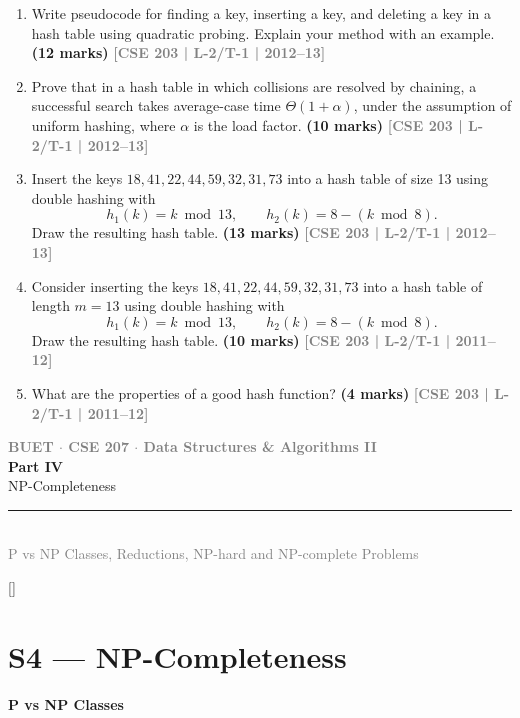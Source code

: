 \documentclass[12pt,a3paper]{article}
\newcommand{\yr}[1]{\hfill\textcolor{gray}{\small\textbf{[#1]}}}
\newcommand{\mk}[1]{\textcolor{orange!70!black}{\small\textbf{(#1 marks)}}}
\newcommand{\subtopic}[2]{%
  \vspace{10pt}
  \noindent\begin{tcolorbox}[colback=#1!8,colframe=#1,boxrule=0.6pt,arc=4pt,
    left=6pt,right=6pt,top=4pt,bottom=4pt]
    \small\bfseries\textcolor{#1}{#2}
  \end{tcolorbox}
  \vspace{2pt}
}
\newcommand{\secdivider}[5]{%
  \newpage\thispagestyle{empty}%
  \vspace*{\fill}%
  \begin{tcolorbox}[enhanced,colback=#4!7,colframe=#3,boxrule=1.5pt,arc=8pt,
    left=20pt,right=20pt,top=22pt,bottom=22pt,
    shadow={3pt}{-3pt}{0pt}{black!15}]
    \centering
    {\large\textcolor{gray}{\textbf{BUET $\cdot$ CSE 207 $\cdot$ Data Structures \& Algorithms II}}}\\[8pt]
    {\fontsize{26}{32}\selectfont\bfseries\textcolor{#3}{#1}}\\[6pt]
    {\fontsize{15}{19}\selectfont\textcolor{dgray}{#2}}\\[12pt]
    \textcolor{#3!60}{\rule{0.5\textwidth}{0.5pt}}\\[6pt]
    {\small\textcolor{gray}{#5}}
  \end{tcolorbox}%
  \vspace*{\fill}\newpage%
}
\begin{document}
\begin{enumerate}
\item Write pseudocode for finding a key, inserting a key, and deleting a key in a hash table using quadratic probing. Explain your method with an example. \mk{12}
\yr{CSE 203 | L-2/T-1 | 2012--13}

\item Prove that in a hash table in which collisions are resolved by chaining, a successful search takes average-case time $\Theta(1 + \alpha)$, under the assumption of uniform hashing, where $\alpha$ is the load factor. \mk{10}
\yr{CSE 203 | L-2/T-1 | 2012--13}

\item Insert the keys $18, 41, 22, 44, 59, 32, 31, 73$ into a hash table of size 13 using double hashing with
\[ h_1(k) = k \bmod 13, \qquad h_2(k) = 8 - (k \bmod 8). \]
Draw the resulting hash table. \mk{13}
\yr{CSE 203 | L-2/T-1 | 2012--13}

\item Consider inserting the keys $18, 41, 22, 44, 59, 32, 31, 73$ into a hash table of length $m = 13$ using double hashing with
\[ h_1(k) = k \bmod 13, \qquad h_2(k) = 8 - (k \bmod 8). \]
Draw the resulting hash table. \mk{10}
\yr{CSE 203 | L-2/T-1 | 2011--12}


\item What are the properties of a good hash function? \mk{4}
\yr{CSE 203 | L-2/T-1 | 2011--12}



\end{enumerate}

\secdivider{Part IV}{NP-Completeness}{cD}{cD}{P vs NP Classes, Reductions, NP-hard and NP-complete Problems}
\titleformat{\section}{\large\bfseries\color{cD}}{}{0em}{}[\titlerule]

\section{S4 --- NP-Completeness}
\label{sec:S4}

\subtopic{cD}{P vs NP Classes}
\label{sub:s4-pvsnp}
\end{document}
